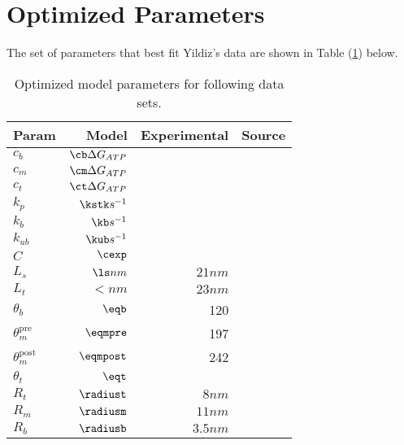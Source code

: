 \section{Optimized Parameters}\label{sec:Params}
The set of parameters that best fit Yildiz's data are shown in Table (\ref{tab:params}) below.

\begin{table}[H]
  \centering
  \begin{tabular}{|l | r | r | r|}
  	\hline
    Param & Model & Experimental & Source \\
    \hline
    $c_b$ & $\cb \Delta G_{ATP}$ &  & \\
    $c_m$ & $\cm \Delta G_{ATP}$ &  & \\
    $c_t$ & $\ct \Delta G_{ATP}$ &  & \\
    $k_p$ & $\kstk s^{-1}$&  & \\
    $k_b$ & $\kb s^{-1}$&  & \\
    $k_{ub}$ & $\kub s^{-1}$ & & \\
    $C$ & $\cexp$ & & \\
    $L_s$ & $\ls nm$ & $21nm$ & \cite{Burgess2003, 3vkh-cite, carter-paper}\\
    $L_t$ & $\lt nm$ & $23nm$ & \cite{Burgess2003, 3vkh-cite, carter-paper}\\
    $\theta_b$ & $\eqb$ &  120 & \cite{leschziner} \\
    $\theta_m^{\mbox{pre}}$ & $\eqmpre$ &  197 & \cite{Burgess2003}\\
    $\theta_m^{\mbox{post}}$ & $\eqmpost$ & 242 & \cite{Burgess2003}\\
    $\theta_t$ & $\eqt$ &  & \\
    $R_t$ & $\radiust$ & $8nm$ & \cite{Burgess2003}\\
    $R_m$ & $\radiusm$ & $11nm$ & \cite{Burgess2003}\\
    $R_b$ & $\radiusb$ & $3.5nm$ & \cite{Burgess2003}\\
    \hline
  \end{tabular}
  \caption{Optimized model parameters for following data sets. }
  \label{tab:params}
\end{table}

